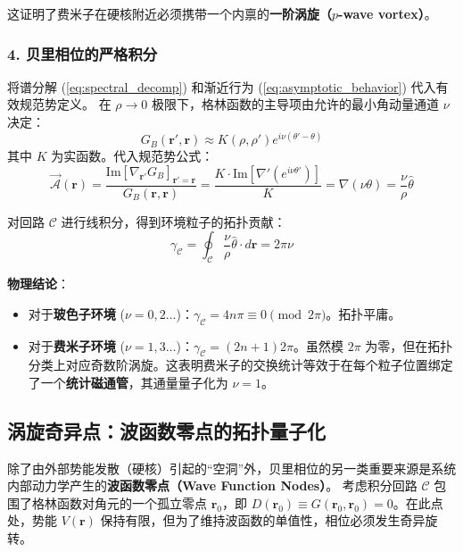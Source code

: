 \documentclass[a4paper,12pt]{article}
\begin{document}
这证明了费米子在硬核附近必须携带一个内禀的\textbf{一阶涡旋（$p$-wave vortex）}。

\subsubsection{4. 贝里相位的严格积分}

将谱分解 (\ref{eq:spectral_decomp}) 和渐近行为 (\ref{eq:asymptotic_behavior}) 代入有效规范势定义。
在 $\rho \to 0$ 极限下，格林函数的主导项由允许的最小角动量通道 $\nu$ 决定：
\begin{equation}
    G_B(\mathbf{r}', \mathbf{r}) \approx K(\rho, \rho') e^{i\nu(\theta' - \theta)}
\end{equation}
其中 $K$ 为实函数。代入规范势公式：
\begin{equation}
    \vec{\mathcal{A}}(\mathbf{r}) = \frac{\text{Im}[\nabla_{\mathbf{r}'} G_B]_{\mathbf{r}'=\mathbf{r}}}{G_B(\mathbf{r}, \mathbf{r})} = \frac{K \cdot \text{Im}[\nabla'(e^{i\nu\theta'})]}{K} = \nabla(\nu \theta) = \frac{\nu}{\rho} \hat{\theta}
\end{equation}

对回路 $\mathcal{C}$ 进行线积分，得到环境粒子的拓扑贡献：
\begin{equation}
    \gamma_{\mathcal{C}} = \oint_{\mathcal{C}} \frac{\nu}{\rho} \hat{\theta} \cdot d\mathbf{r} = 2\pi \nu
\end{equation}

\textbf{物理结论}：
\begin{itemize}
    \item 对于\textbf{玻色子环境} ($\nu=0, 2\dots$)：$\gamma_{\mathcal{C}} = 4n\pi \equiv 0 \pmod{2\pi}$。拓扑平庸。
    \item 对于\textbf{费米子环境} ($\nu=1, 3\dots$)：$\gamma_{\mathcal{C}} = (2n+1)2\pi$。虽然模 $2\pi$ 为零，但在拓扑分类上对应奇数阶涡旋。这表明费米子的交换统计等效于在每个粒子位置绑定了一个\textbf{统计磁通管}，其通量量子化为 $\nu=1$。
\end{itemize}

\subsection{涡旋奇异点：波函数零点的拓扑量子化}

除了由外部势能发散（硬核）引起的“空洞”外，贝里相位的另一类重要来源是系统内部动力学产生的\textbf{波函数零点（Wave Function Nodes）}。
考虑积分回路 $\mathcal{C}$ 包围了格林函数对角元的一个孤立零点 $\mathbf{r}_0$，即 $D(\mathbf{r}_0) \equiv G(\mathbf{r}_0, \mathbf{r}_0) = 0$。在此点处，势能 $V(\mathbf{r})$ 保持有限，但为了维持波函数的单值性，相位必须发生奇异旋转。
\end{document}
